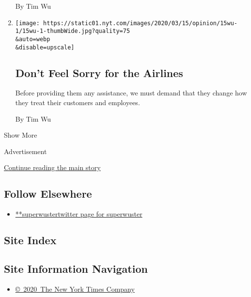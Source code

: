 \begin{enumerate}
  By Tim Wu
\item
  \href{/2020/03/16/opinion/airlines-bailout.html}{}

  \texttt{[image: https://static01.nyt.com/images/2020/03/15/opinion/15wu-1/15wu-1-thumbWide.jpg?quality=75\\\&auto=webp\\\&disable=upscale]}

  \hypertarget{dont-feel-sorry-for-the-airlines}{%
  \subsection{Don't Feel Sorry for the
  Airlines}\label{dont-feel-sorry-for-the-airlines}}

  Before providing them any assistance, we must demand that they change
  how they treat their customers and employees.

  By Tim Wu
\end{enumerate}

Show More

Advertisement

\protect\hyperlink{after-mid2}{Continue reading the main story}

\hypertarget{follow-elsewhere}{%
\subsection{Follow Elsewhere}\label{follow-elsewhere}}

\begin{itemize}
\tightlist
\item
  \href{https://twitter.com/superwuster}{**superwustertwitter page for
  superwuster}
\end{itemize}

\hypertarget{site-index}{%
\subsection{Site Index}\label{site-index}}

\hypertarget{site-information-navigation}{%
\subsection{Site Information
Navigation}\label{site-information-navigation}}

\begin{itemize}
\tightlist
\item
  \href{https://help.nytimes.com/hc/en-us/articles/115014792127-Copyright-notice}{©~2020~The
  New York Times Company}
\end{itemize}

